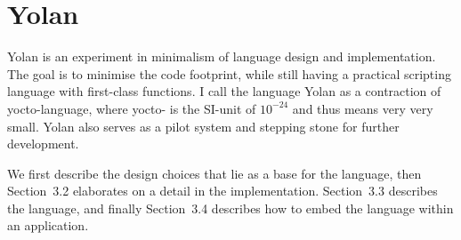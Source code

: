 \documentclass[11pt]{report}
\begin{document}
%
%
%
%
\chapter{Yolan}
\label{yolan}
Yolan is an experiment in minimalism of language design and implementation. 
The goal is to minimise the code footprint, while still having a practical scripting language with first-class functions.
I call the language Yolan as a contraction of yocto-language, where yocto- is the SI-unit of $10^{-24}$ and thus means very very small.
Yolan also serves as a pilot system and stepping stone for further development.

We first describe the design choices that lie as a base for the language, then Section~3.2 elaborates on a detail in the implementation. Section~3.3 describes the language, and finally Section~3.4 describes how to embed the language within an application.
\end{document}
